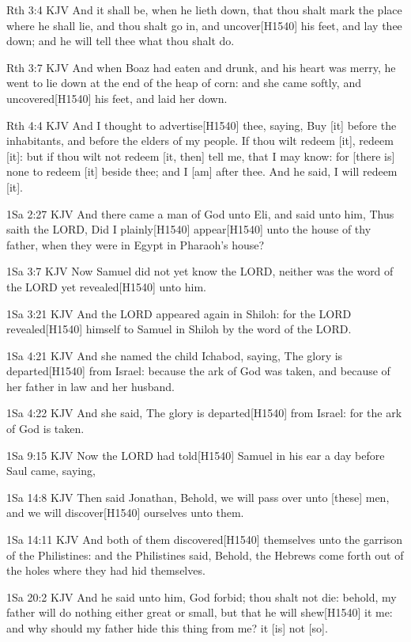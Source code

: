 \documentclass{book}
\begin{document}
Rth 3:4 KJV
And it shall be, when he lieth down, that thou shalt mark the place where he shall lie, and thou shalt go in, and uncover[H1540] his feet, and lay thee down; and he will tell thee what thou shalt do.

Rth 3:7 KJV
And when Boaz had eaten and drunk, and his heart was merry, he went to lie down at the end of the heap of corn: and she came softly, and uncovered[H1540] his feet, and laid her down.

Rth 4:4 KJV
And I thought to advertise[H1540] thee, saying, Buy [it] before the inhabitants, and before the elders of my people. If thou wilt redeem [it], redeem [it]: but if thou wilt not redeem [it, then] tell me, that I may know: for [there is] none to redeem [it] beside thee; and I [am] after thee. And he said, I will redeem [it].

1Sa 2:27 KJV
And there came a man of God unto Eli, and said unto him, Thus saith the LORD, Did I plainly[H1540] appear[H1540] unto the house of thy father, when they were in Egypt in Pharaoh's house?

1Sa 3:7 KJV
Now Samuel did not yet know the LORD, neither was the word of the LORD yet revealed[H1540] unto him.

1Sa 3:21 KJV
And the LORD appeared again in Shiloh: for the LORD revealed[H1540] himself to Samuel in Shiloh by the word of the LORD.

1Sa 4:21 KJV
And she named the child Ichabod, saying, The glory is departed[H1540] from Israel: because the ark of God was taken, and because of her father in law and her husband.

1Sa 4:22 KJV
And she said, The glory is departed[H1540] from Israel: for the ark of God is taken.

1Sa 9:15 KJV
Now the LORD had told[H1540] Samuel in his ear a day before Saul came, saying,

1Sa 14:8 KJV
Then said Jonathan, Behold, we will pass over unto [these] men, and we will discover[H1540] ourselves unto them.

1Sa 14:11 KJV
And both of them discovered[H1540] themselves unto the garrison of the Philistines: and the Philistines said, Behold, the Hebrews come forth out of the holes where they had hid themselves.

1Sa 20:2 KJV
And he said unto him, God forbid; thou shalt not die: behold, my father will do nothing either great or small, but that he will shew[H1540] it me: and why should my father hide this thing from me? it [is] not [so].
\end{document}
